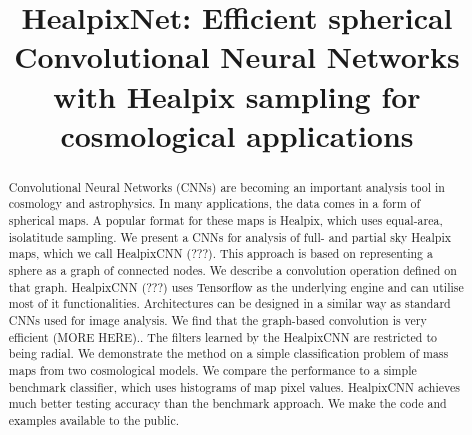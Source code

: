 \documentclass[final,twocolumn,3p,times,authoryear]{elsarticle}
\newcommand{\1}{\b{1}}              %
\newcommand{\0}{\b{0}}              %
\begin{document}
\begin{frontmatter}



\title{HealpixNet: Efficient spherical Convolutional Neural Networks with Healpix sampling for cosmological applications}


\author{}

\address{}

\begin{abstract}

Convolutional Neural Networks (CNNs) are becoming an important analysis tool in cosmology and astrophysics.
In many applications, the data comes in a form of spherical maps.
A popular format for these maps is Healpix, which uses equal-area, isolatitude sampling.
We present a CNNs for analysis of full- and partial sky Healpix maps, which we call HealpixCNN (???).
This approach is based on representing a sphere as a graph of connected nodes.
We describe a convolution operation defined on that graph.
HealpixCNN (???) uses Tensorflow as the underlying engine and can utilise most of it functionalities.
Architectures can be designed in a similar way as standard CNNs used for image analysis.
We find that the graph-based convolution is very efficient (MORE HERE)..
The filters learned by the HealpixCNN are restricted to being radial.
We demonstrate the method on a simple classification problem of mass maps from two cosmological models.
We compare the performance to a simple benchmark classifier, which uses histograms of map pixel values.
HealpixCNN achieves much better testing accuracy than the benchmark approach.
We make the code and examples available to the public.


\end{abstract}
\end{frontmatter}
\end{document}
